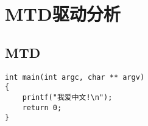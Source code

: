 \chapter{MTD驱动分析}
\section{MTD}

\begin{lstlisting}[language={[ANSI]C}]
int main(int argc, char ** argv)
{
	printf("我爱中文!\n");
	return 0;
}
\end{lstlisting}
